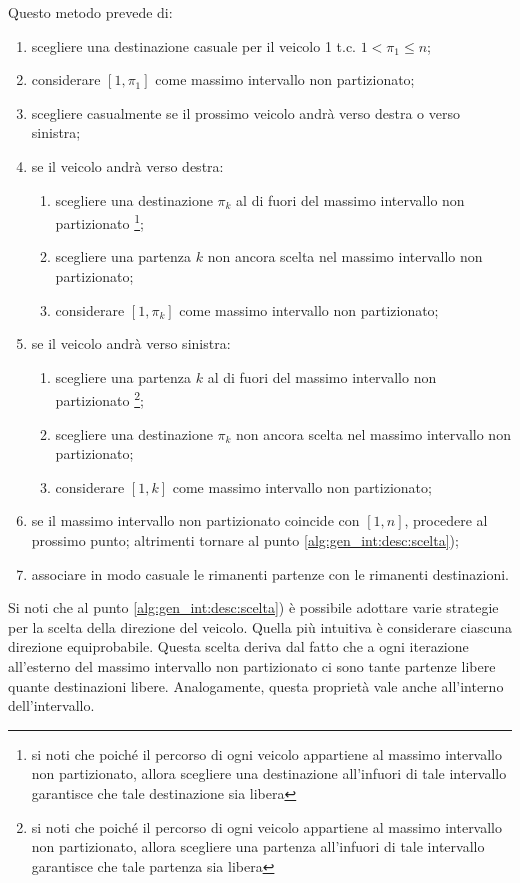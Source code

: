 \documentclass[../../main.tex]{subfiles}
\begin{document}
Questo metodo prevede di:
\begin{enumerate}
    \item scegliere una destinazione casuale per il veicolo 1 t.c. $1 < \pi_1 \leq n$;
    \item considerare $[1, \pi_1]$ come massimo intervallo non partizionato;
    \item scegliere casualmente se il prossimo veicolo andrà verso destra o verso sinistra;
    \label{alg:gen_int:desc:scelta}
    \item se il veicolo andrà verso destra:
    \begin{enumerate}
        \item scegliere una destinazione $\pi_k$ al di fuori del massimo intervallo non partizionato
        \footnote{si noti che poiché il percorso di ogni veicolo appartiene al massimo intervallo non partizionato, allora scegliere una destinazione all'infuori di tale intervallo garantisce che tale destinazione sia libera};
        \item scegliere una partenza $k$ non ancora scelta nel massimo intervallo non partizionato;
        \item considerare $[1, \pi_k]$ come massimo intervallo non partizionato;
    \end{enumerate}
    \item se il veicolo andrà verso sinistra:
    \begin{enumerate}
        \item scegliere una partenza $k$ al di fuori del massimo intervallo non partizionato
        \footnote{si noti che poiché il percorso di ogni veicolo appartiene al massimo intervallo non partizionato, allora scegliere una partenza all'infuori di tale intervallo garantisce che tale partenza sia libera};
        \item scegliere una destinazione $\pi_k$ non ancora scelta nel massimo intervallo non partizionato;
        \item considerare $[1, k]$ come massimo intervallo non partizionato;
    \end{enumerate}
    \item se il massimo intervallo non partizionato coincide con $[1, n]$, procedere al prossimo punto;
    altrimenti tornare al punto \ref{alg:gen_int:desc:scelta});
    \item associare in modo casuale le rimanenti partenze con le rimanenti destinazioni.
\end{enumerate}

Si noti che al punto \ref{alg:gen_int:desc:scelta}) è possibile adottare varie strategie per la scelta della direzione del veicolo.
Quella più intuitiva è considerare ciascuna direzione equiprobabile.
Questa scelta deriva dal fatto che a ogni iterazione all'esterno del massimo intervallo non partizionato ci sono tante partenze libere quante destinazioni libere.
Analogamente, questa proprietà vale anche all'interno dell'intervallo.
\end{document}
